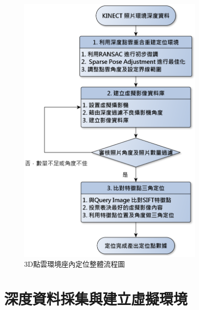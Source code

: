%  
\begin{figure}
\begin{center}
  \includegraphics[width=0.8\textwidth]{figures/System_Process.eps}
  \caption{3D點雲環境座內定位整體流程圖}
  \label{fig:Entire System Process} 
\end{center}
\end{figure}
  
\section{深度資料採集與建立虛擬環境}

